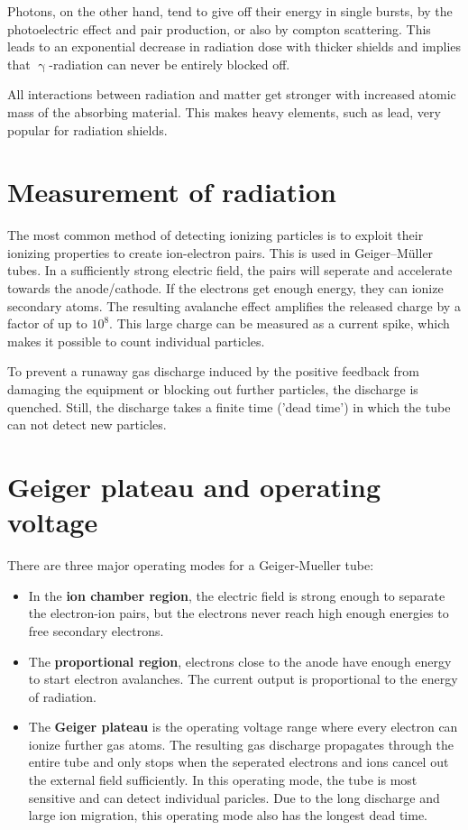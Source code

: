 Photons, on the other hand, tend to give off their energy in single bursts, by the photoelectric effect and pair production, or also by compton scattering.
This leads to an exponential decrease in radiation dose with thicker shields and implies that $\upgamma$-radiation can never be entirely blocked off.

All interactions between radiation and matter get stronger with increased atomic mass of the absorbing material.
This makes heavy elements, such as lead, very popular for radiation shields.

\section{Measurement of radiation}
The most common method of detecting ionizing particles is to exploit their ionizing properties to create ion-electron pairs.
This is used in Geiger–Müller tubes.
In a sufficiently strong electric field, the pairs will seperate and accelerate towards the anode/cathode.
If the electrons get enough energy, they can ionize secondary atoms.
The resulting avalanche effect amplifies the released charge by a factor of up to $10^8$.
This large charge can be measured as a current spike, which makes it possible to count individual particles.

To prevent a runaway gas discharge induced by the positive feedback from damaging the equipment or blocking out further particles, the discharge is quenched.
Still, the discharge takes a finite time ('dead time') in which the tube can not detect new particles.

\section{Geiger plateau and operating voltage}
There are three major operating modes for a Geiger-Mueller tube:
\begin{itemize}
	\item In the \textbf{ion chamber region}, the electric field is strong enough to separate the electron-ion pairs, but the electrons never reach high enough energies to free secondary electrons.
	\item The \textbf{proportional region}, electrons close to the anode have enough energy to start electron avalanches. The current output is proportional to the energy of radiation.
	\item The \textbf{Geiger plateau} is the operating voltage range where every electron can ionize further gas atoms.
	The resulting gas discharge propagates through the entire tube and only stops when the seperated electrons and ions cancel out the external field sufficiently.
	In this operating mode, the tube is most sensitive and can detect individual paricles.
	Due to the long discharge and large ion migration, this operating mode also has the longest dead time.
\end{itemize}
